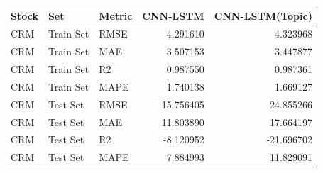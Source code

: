\begin{tabular}{lllrr}
\toprule
Stock & Set & Metric & CNN-LSTM & CNN-LSTM(Topic) \\
\midrule
CRM & Train Set & RMSE & 4.291610 & 4.323968 \\
CRM & Train Set & MAE & 3.507153 & 3.447877 \\
CRM & Train Set & R2 & 0.987550 & 0.987361 \\
CRM & Train Set & MAPE & 1.740138 & 1.669127 \\
CRM & Test Set & RMSE & 15.756405 & 24.855266 \\
CRM & Test Set & MAE & 11.803890 & 17.664197 \\
CRM & Test Set & R2 & -8.120952 & -21.696702 \\
CRM & Test Set & MAPE & 7.884993 & 11.829091 \\
\bottomrule
\end{tabular}
